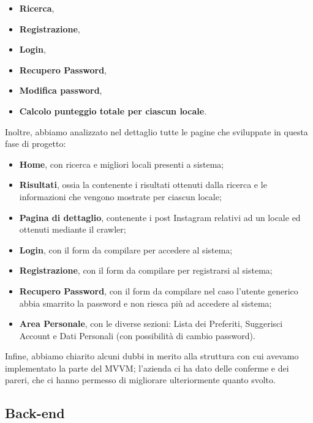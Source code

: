 \begin{itemize}
\item \textbf{Ricerca},
\item \textbf{Registrazione},
\item \textbf{Login},
\item \textbf{Recupero Password},
\item \textbf{Modifica password},
\item \textbf{Calcolo punteggio totale per ciascun locale}.
\end{itemize}

Inoltre, abbiamo analizzato nel dettaglio tutte le pagine che sviluppate in questa fase di progetto: 

\begin{itemize}
\item \textbf{Home}, con ricerca e migliori locali presenti a sistema;
\item \textbf{Risultati}, ossia la contenente i risultati ottenuti dalla ricerca e le informazioni che vengono mostrate per ciascun locale;
\item \textbf{Pagina di dettaglio}, contenente i post Instagram relativi ad un locale ed ottenuti mediante il crawler;
\item \textbf{Login}, con il form da compilare per accedere al sistema;
\item \textbf{Registrazione}, con il form da compilare per registrarsi al sistema;
\item \textbf{Recupero Password}, con il form da compilare nel caso l'utente generico abbia smarrito la password e non riesca più ad accedere al sistema;
\item \textbf{Area Personale}, con le diverse sezioni: Lista dei Preferiti, Suggerisci Account e Dati Personali (con possibilità di cambio password).
\end{itemize}

Infine, abbiamo chiarito alcuni dubbi in merito alla struttura con cui avevamo implementato la parte del MVVM; l'azienda ci ha dato delle conferme e dei pareri, che ci hanno permesso di migliorare ulteriormente quanto svolto.

\subsection{Back-end}


\pagebreak
